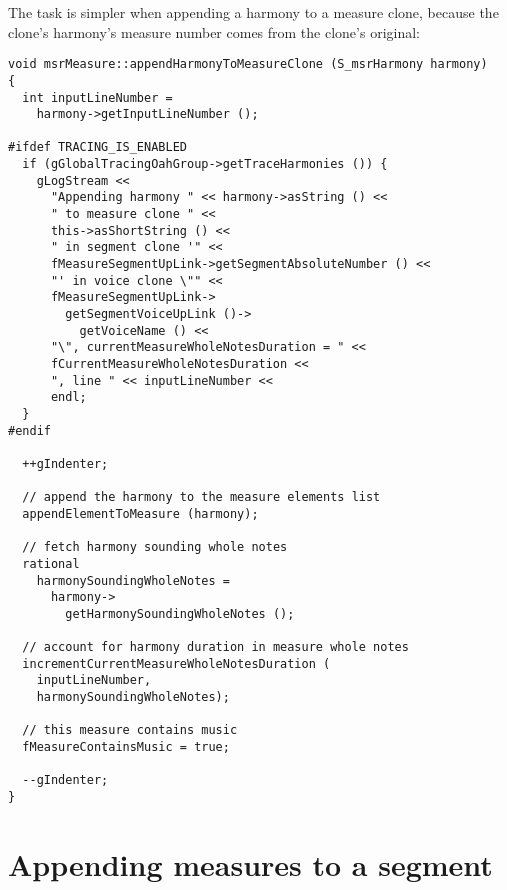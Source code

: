 The task is simpler when appending a harmony to a measure clone, because the clone's harmony's measure number comes from the clone's original:
\begin{lstlisting}[language=CPlusPlus]
void msrMeasure::appendHarmonyToMeasureClone (S_msrHarmony harmony)
{
  int inputLineNumber =
    harmony->getInputLineNumber ();

#ifdef TRACING_IS_ENABLED
  if (gGlobalTracingOahGroup->getTraceHarmonies ()) {
    gLogStream <<
      "Appending harmony " << harmony->asString () <<
      " to measure clone " <<
      this->asShortString () <<
      " in segment clone '" <<
      fMeasureSegmentUpLink->getSegmentAbsoluteNumber () <<
      "' in voice clone \"" <<
      fMeasureSegmentUpLink->
        getSegmentVoiceUpLink ()->
          getVoiceName () <<
      "\", currentMeasureWholeNotesDuration = " <<
      fCurrentMeasureWholeNotesDuration <<
      ", line " << inputLineNumber <<
      endl;
  }
#endif

  ++gIndenter;

  // append the harmony to the measure elements list
  appendElementToMeasure (harmony);

  // fetch harmony sounding whole notes
  rational
    harmonySoundingWholeNotes =
      harmony->
        getHarmonySoundingWholeNotes ();

  // account for harmony duration in measure whole notes
  incrementCurrentMeasureWholeNotesDuration (
    inputLineNumber,
    harmonySoundingWholeNotes);

  // this measure contains music
  fMeasureContainsMusic = true;

  --gIndenter;
}
\end{lstlisting}


\section{Appending measures to a segment}

